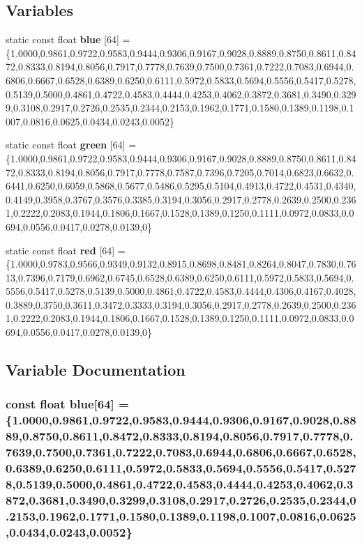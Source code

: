 \subsection*{Variables}
\begin{DoxyCompactItemize}
\item 
static const float {\bf blue} [64] = \{1.0000,0.9861,0.9722,0.9583,0.9444,0.9306,0.9167,0.9028,0.8889,0.8750,0.8611,0.8472,0.8333,0.8194,0.8056,0.7917,0.7778,0.7639,0.7500,0.7361,0.7222,0.7083,0.6944,0.6806,0.6667,0.6528,0.6389,0.6250,0.6111,0.5972,0.5833,0.5694,0.5556,0.5417,0.5278,0.5139,0.5000,0.4861,0.4722,0.4583,0.4444,0.4253,0.4062,0.3872,0.3681,0.3490,0.3299,0.3108,0.2917,0.2726,0.2535,0.2344,0.2153,0.1962,0.1771,0.1580,0.1389,0.1198,0.1007,0.0816,0.0625,0.0434,0.0243,0.0052\}
\item 
static const float {\bf green} [64] = \{1.0000,0.9861,0.9722,0.9583,0.9444,0.9306,0.9167,0.9028,0.8889,0.8750,0.8611,0.8472,0.8333,0.8194,0.8056,0.7917,0.7778,0.7587,0.7396,0.7205,0.7014,0.6823,0.6632,0.6441,0.6250,0.6059,0.5868,0.5677,0.5486,0.5295,0.5104,0.4913,0.4722,0.4531,0.4340,0.4149,0.3958,0.3767,0.3576,0.3385,0.3194,0.3056,0.2917,0.2778,0.2639,0.2500,0.2361,0.2222,0.2083,0.1944,0.1806,0.1667,0.1528,0.1389,0.1250,0.1111,0.0972,0.0833,0.0694,0.0556,0.0417,0.0278,0.0139,0\}
\item 
static const float {\bf red} [64] = \{1.0000,0.9783,0.9566,0.9349,0.9132,0.8915,0.8698,0.8481,0.8264,0.8047,0.7830,0.7613,0.7396,0.7179,0.6962,0.6745,0.6528,0.6389,0.6250,0.6111,0.5972,0.5833,0.5694,0.5556,0.5417,0.5278,0.5139,0.5000,0.4861,0.4722,0.4583,0.4444,0.4306,0.4167,0.4028,0.3889,0.3750,0.3611,0.3472,0.3333,0.3194,0.3056,0.2917,0.2778,0.2639,0.2500,0.2361,0.2222,0.2083,0.1944,0.1806,0.1667,0.1528,0.1389,0.1250,0.1111,0.0972,0.0833,0.0694,0.0556,0.0417,0.0278,0.0139,0\}
\end{DoxyCompactItemize}


\subsection{Variable Documentation}
\subsubsection[{blue}]{\setlength{\rightskip}{0pt plus 5cm}const float {\bf blue}[64] = \{1.0000,0.9861,0.9722,0.9583,0.9444,0.9306,0.9167,0.9028,0.8889,0.8750,0.8611,0.8472,0.8333,0.8194,0.8056,0.7917,0.7778,0.7639,0.7500,0.7361,0.7222,0.7083,0.6944,0.6806,0.6667,0.6528,0.6389,0.6250,0.6111,0.5972,0.5833,0.5694,0.5556,0.5417,0.5278,0.5139,0.5000,0.4861,0.4722,0.4583,0.4444,0.4253,0.4062,0.3872,0.3681,0.3490,0.3299,0.3108,0.2917,0.2726,0.2535,0.2344,0.2153,0.1962,0.1771,0.1580,0.1389,0.1198,0.1007,0.0816,0.0625,0.0434,0.0243,0.0052\}\hspace{0.3cm}{\ttfamily  [static]}}\label{map_8h_a994a56fa1d2480380394586f82922c7a}



